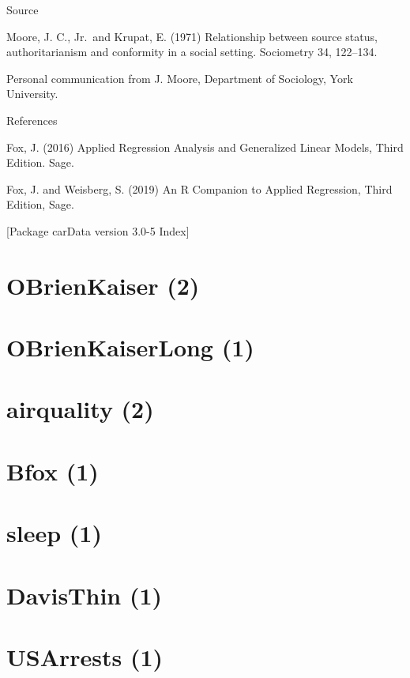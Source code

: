 \documentclass[
]{book}
\begin{document}
Source

Moore, J. C., Jr.~and Krupat, E. (1971)
Relationship between source status, authoritarianism and conformity in a
social setting. Sociometry 34, 122--134.

Personal communication
from J. Moore, Department of Sociology, York University.

References

Fox, J. (2016)
Applied Regression Analysis and Generalized Linear Models,
Third Edition. Sage.

Fox, J. and Weisberg, S. (2019)
An R Companion to Applied Regression, Third Edition, Sage.

{[}Package carData version 3.0-5 Index{]}

\hypertarget{obrienkaiser-2}{%
\section{OBrienKaiser (2)}\label{obrienkaiser-2}}

\hypertarget{obrienkaiserlong-1}{%
\section{OBrienKaiserLong (1)}\label{obrienkaiserlong-1}}

\hypertarget{airquality-2}{%
\section{airquality (2)}\label{airquality-2}}

\hypertarget{bfox-1}{%
\section{Bfox (1)}\label{bfox-1}}

\hypertarget{sleep-1}{%
\section{sleep (1)}\label{sleep-1}}

\hypertarget{davisthin-1}{%
\section{DavisThin (1)}\label{davisthin-1}}

\hypertarget{usarrests-1}{%
\section{USArrests (1)}\label{usarrests-1}}
\end{document}
